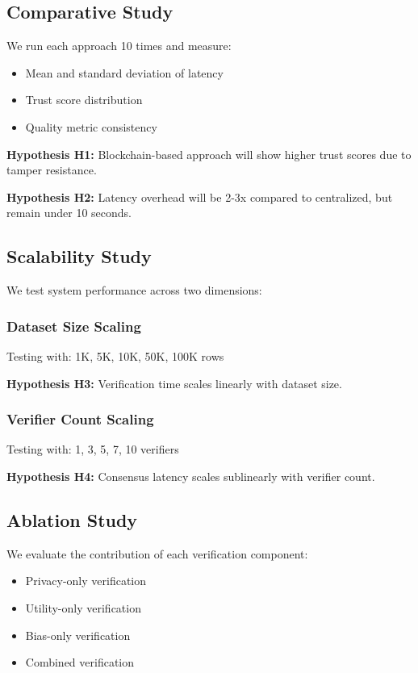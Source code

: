 \subsection{Comparative Study}

We run each approach 10 times and measure:
\begin{itemize}
    \item Mean and standard deviation of latency
    \item Trust score distribution
    \item Quality metric consistency
\end{itemize}

\textbf{Hypothesis H1:} Blockchain-based approach will show higher trust scores due to tamper resistance.

\textbf{Hypothesis H2:} Latency overhead will be 2-3x compared to centralized, but remain under 10 seconds.

\subsection{Scalability Study}

We test system performance across two dimensions:

\subsubsection{Dataset Size Scaling}
Testing with: 1K, 5K, 10K, 50K, 100K rows

\textbf{Hypothesis H3:} Verification time scales linearly with dataset size.

\subsubsection{Verifier Count Scaling}
Testing with: 1, 3, 5, 7, 10 verifiers

\textbf{Hypothesis H4:} Consensus latency scales sublinearly with verifier count.

\subsection{Ablation Study}

We evaluate the contribution of each verification component:
\begin{itemize}
    \item Privacy-only verification
    \item Utility-only verification
    \item Bias-only verification
    \item Combined verification
\end{itemize}

